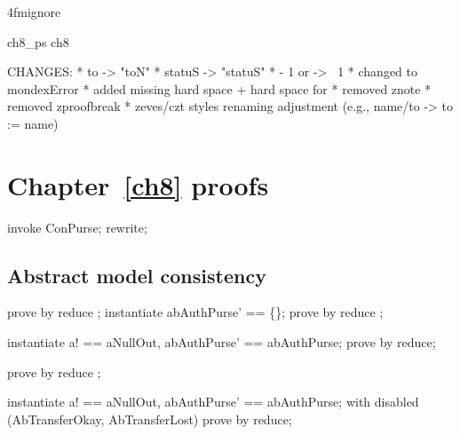 \ai4fmignore{
\begin{zsection}
  \SECTION ch8\_ps \parents ch8
\end{zsection}
CHANGES:
* to -> "toN"
* statuS -> "statuS"
* - 1 or  -> \negate~1
* changed \bot to mondexError
* added missing hard space + hard space for \inv
* removed znote
* removed zproofbreak
* zeves/czt styles renaming adjustment (e.g., name/to -> to := name)
}
\chapter{Chapter~\ref{ch8} proofs}

\begin{LPScript}\begin{zproof}[fConPurseNextSeqNoMaxType]
    invoke ConPurse;
    rewrite;
\end{zproof}\end{LPScript}

\section{Abstract model consistency}

\begin{LPScript}\begin{zproof}[tExistsInitialAbWorld]
   prove by reduce ;
   instantiate abAuthPurse' == \{\};
   prove by reduce ;
\end{zproof}\end{LPScript}

\begin{LPScript}\begin{zproof}[tAbOpIsTotal]
    instantiate a! == aNullOut, abAuthPurse' == abAuthPurse;
    prove by reduce;
\end{zproof}\end{LPScript}

\begin{LPScript}\begin{zproof}[tAbIgnoreIsTotal]
   prove by reduce ;
\end{zproof}\end{LPScript}

\begin{LPScript}\begin{zproof}[tAbTransferIsTotal]
    instantiate a! == aNullOut, abAuthPurse' == abAuthPurse;
    with disabled (AbTransferOkay, AbTransferLost) prove by reduce;
\end{zproof}\end{LPScript}

